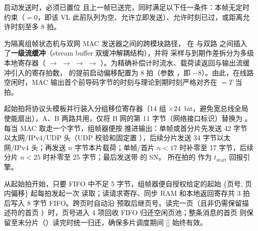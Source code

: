 启动发送时，必须已置位  且上一帧已送完，同时满足以下任一条件：本帧无定时约束（$=0$，即该 VL 此前队列为空、允许立即发送）、允许时刻已过，或距离允许时刻至多 8 拍。

为隔离组帧状态机与双网 MAC 发送器之间的跨模块路径， 在  与双路  之间插入了\textbf{一级流缓冲}（stream buffer 双缓冲解耦结构），并将  采样与到期作差拆分为多级本地寄存器（ $\rightarrow$  $\rightarrow$  $\rightarrow$  $\rightarrow$ ）。为精确补偿计时流水、载荷读返回与输出流缓冲引入的寄存拍数， 的提前启动偏移配置为 8 拍（参数 ，即 $-8$）。由此，在线路空闲时，MAC 输出首个前导码字节的时刻与理论到期时刻严格对齐在 $=T$ 当拍。

起始拍将协议头模板并行装入分组移位寄存器（14 组 $\times 24$~bit，避免宽总线全局使能扇出），A、B 两路共用，仅将 B 网的第 11 字节（网络接口标识）替换为 。每当 MAC 取走一个字节，组帧器便按  推进输出：单帧或首分片先发送 42 字节以太网/IPv4/UDP 头（UDP 校验和固定置 ），后续分片发送 34 字节以太网/IPv4 头；再发送 $n$ 字节本片载荷；单帧/首片 $n<17$ 时补零至 17 字节，后续分片 $n<25$ 时补零至 25 字节；最后发送带  的 SN。 所在拍的  作为 $t_\text{start}$ 回报引擎。

从起始拍开始，只要 FIFO 中不足 5 字节，组帧器便自授权给定的起始 \{页号, 页内偏移\} 起每拍发起一次  读取；读请求寄存、同步 RAM 和本地返回寄存共 3 拍后写入 8 字节 FIFO。跨页时自动沿  预取后继页号。读完一页（且非仍需保留描述符的首页 ）时，页号进入 4 项回收 FIFO 归还空闲页池；整条消息的首页  则保留至末分片（）读完时统一归还，确保多片调度期间 [] 始终有效。

